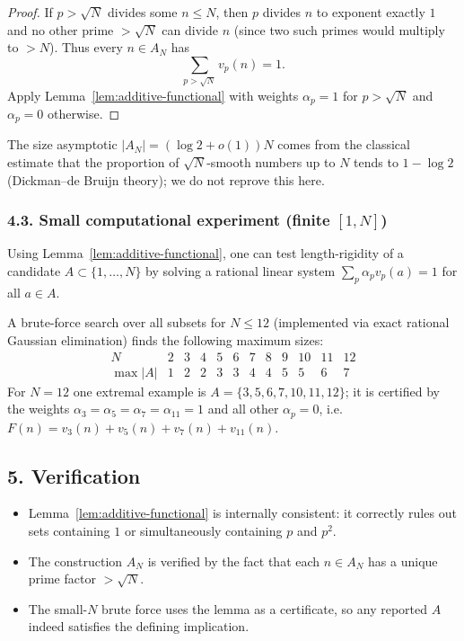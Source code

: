 \begin{proof}
If $p>\sqrt N$ divides some $n\le N$, then $p$ divides $n$ to exponent exactly $1$ and no other prime $>\sqrt N$ can divide $n$ (since two such primes would multiply to $>N$). Thus every $n\in A_N$ has
\[
\sum_{p>\sqrt N} v_p(n)=1.
\]
Apply Lemma~\ref{lem:additive-functional} with weights $\alpha_p=1$ for $p>\sqrt N$ and $\alpha_p=0$ otherwise.
\end{proof}

The size asymptotic $|A_N|=(\log 2+o(1))N$ comes from the classical estimate that the proportion of $\sqrt N$-smooth numbers up to $N$ tends to $1-\log 2$ (Dickman--de Bruijn theory); we do not reprove this here.

\subsubsection*{4.3. Small computational experiment (finite $[1,N]$)}
Using Lemma~\ref{lem:additive-functional}, one can test length-rigidity of a candidate $A\subset\{1,\dots,N\}$ by solving a rational linear system $\sum_p \alpha_p v_p(a)=1$ for all $a\in A$.

A brute-force search over all subsets for $N\le 12$ (implemented via exact rational Gaussian elimination) finds the following maximum sizes:
\[
\begin{array}{c|ccccccccccc}
N&2&3&4&5&6&7&8&9&10&11&12\\\hline
\max|A|&1&2&2&3&3&4&4&5&5&6&7
\end{array}
\]
For $N=12$ one extremal example is $A=\{3,5,6,7,10,11,12\}$; it is certified by the weights
$\alpha_3=\alpha_5=\alpha_7=\alpha_{11}=1$ and all other $\alpha_p=0$, i.e.
$F(n)=v_3(n)+v_5(n)+v_7(n)+v_{11}(n)$.

\subsection*{5. Verification}
\begin{itemize}[leftmargin=2em]
\item Lemma~\ref{lem:additive-functional} is internally consistent: it correctly rules out sets containing $1$ or simultaneously containing $p$ and $p^2$.
\item The construction $A_N$ is verified by the fact that each $n\in A_N$ has a unique prime factor $>\sqrt N$.
\item The small-$N$ brute force uses the lemma as a certificate, so any reported $A$ indeed satisfies the defining implication.
\end{itemize}

